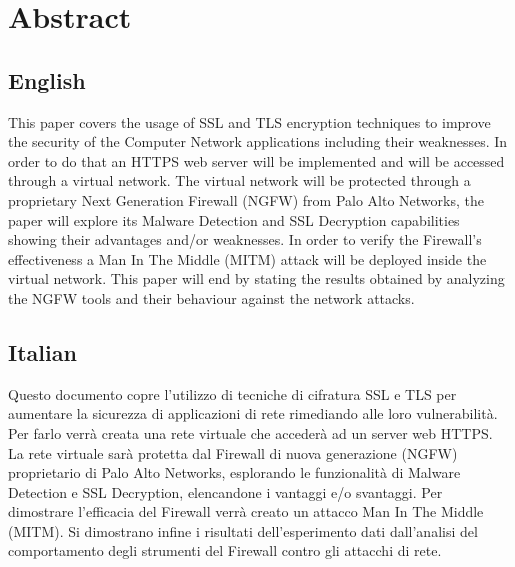 \thispagestyle{empty} %
\cleardoublepage






\tableofcontents

\printglossaries


\chapter{Abstract}
\section{English}

This paper covers the usage of SSL and TLS encryption techniques to improve the security of the Computer Network applications including their weaknesses. In order to do that an HTTPS web server will be implemented and will be accessed through a virtual network.
The virtual network will be protected through a proprietary Next Generation Firewall (NGFW) from Palo Alto Networks, the paper will explore its Malware Detection and SSL Decryption capabilities showing their advantages and/or weaknesses.
In order to verify the Firewall's effectiveness a Man In The Middle (MITM) attack will be deployed inside the virtual network.
This paper will end by stating the results obtained by analyzing the NGFW tools and their behaviour against the network attacks.

\section{Italian}

Questo documento copre l'utilizzo di tecniche di cifratura SSL e TLS per aumentare la sicurezza di applicazioni di rete rimediando alle loro vulnerabilit\`a.
Per farlo verr\`a creata una rete virtuale che acceder\`a ad un server web HTTPS.
La rete virtuale sar\`a protetta dal Firewall di nuova generazione (NGFW) proprietario di Palo Alto Networks, esplorando le funzionalit\`a di Malware Detection e SSL Decryption, elencandone i vantaggi e/o svantaggi.
Per dimostrare l'efficacia del Firewall verr\`a creato un attacco Man In The Middle (MITM).
Si dimostrano infine i risultati dell'esperimento dati dall'analisi del comportamento degli strumenti del Firewall contro gli attacchi di rete.



